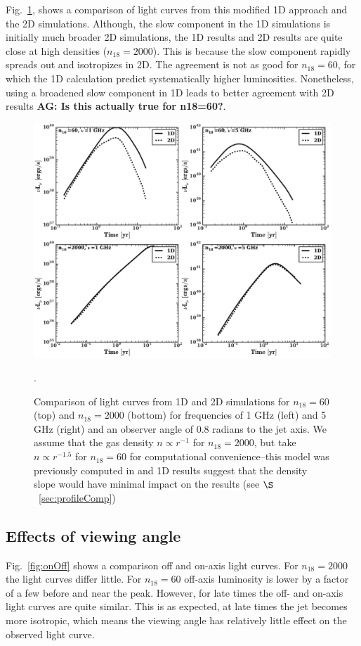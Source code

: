 \documentclass[usenatbib,fleqn]{mnras}
\begin{document}
Fig.~\ref{fig:1D2DB}, shows a comparison of light curves from this
modified 1D approach and the 2D simulations. Although, the slow
component in the 1D simulations is initially much broader 2D
simulations, the 1D results and 2D results are quite close at high
densities ($n_{18}=2000$). This is because the slow component rapidly
spreads out and isotropizes in 2D. The agreement is not as good for
$n_{18}=60$, for which the 1D calculation predict systematically
higher luminosities. Nonetheless, using a broadened slow component in
1D leads to better agreement with 2D results {\bf AG: Is this actually
  true for n18=60?}.

\begin{figure}
\includegraphics[width=16cm]{1D_2D.pdf}
\caption{\label{fig:1D2DB} Comparison of light curves from 1D and 2D
  simulations for $n_{18}=60$ (top) and $n_{18}=2000$ (bottom) for
  frequencies of 1 GHz (left) and 5 GHz (right) and an observer angle
  of 0.8 radians to the jet axis. We assume that the gas density
  $n\propto r^{-1}$ for $n_{18}=2000$, but take $n\propto r^{-1.5}$
  for $n_{18}=60$ for computational convenience--this model was
  previously computed in \citet{Mimica+2015} and 1D results suggest
  that the density slope would have minimal impact on the results (see
  $\S$~\ref{sec:profileComp})}.
\end{figure}

 \subsection{Effects of viewing angle}
Fig.~\ref{fig:onOff} shows a comparison off and on-axis light curves.
For $n_{18}=2000$ the light curves differ little.  For $n_{18}=60$
off-axis luminosity is lower by a factor of a few before and near the
peak. However, for late times the off- and on-axis light curves are
quite similar. This is as expected, at late times the jet becomes more
isotropic, which means the viewing angle has relatively little effect
on the observed light curve.
\end{document}
